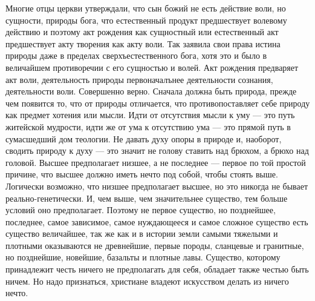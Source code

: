 \documentclass[12pt,oneside]{book}
\begin{document}
Многие отцы церкви утверждали, что сын божий не есть действие воли, но сущности, природы бога, что естественный продукт предшествует волевому действию и поэтому акт рождения как сущностный или естественный акт предшествует акту творения как акту воли. Так заявила свои права истина природы даже в пределах сверхъестественного бога, хотя это и было в величайшем противоречии с его сущностью и волей. Акт рождения предваряет акт воли, деятельность природы первоначалънее деятельности сознания, деятельности воли. Совершенно верно. Сначала должна быть природа, прежде чем появится то, что от природы отличается, что противопоставляет себе природу как предмет хотения или мысли. Идти от отсутствия мысли к уму --- это путь житейской мудрости, идти же от ума к отсутствию ума --- это прямой путь в сумасшедший дом теологии. Не давать духу опоры в природе и, наоборот, сводить природу к духу --- это значит не голову ставить над брюхом, а брюхо над головой. Высшее предполагает низшее, а не последнее --- первое по той простой причине, что высшее должно иметь нечто под собой, чтобы стоять выше. Логически возможно, что низшее предполагает высшее, но это никогда не бывает реально-генетически. И, чем выше, чем значительнее существо, тем больше условий оно предполагает. Поэтому не первое существо, но позднейшее, последнее, самое зависимое, самое нуждающееся и самое сложное существо есть существо величайшее, так же как и в истории земли самыми тяжелыми и плотными оказываются не древнейшие, первые породы, сланцевые и гранитные, но позднейшие, новейшие, базальты и плотные лавы. Существо, которому принадлежит честь ничего не предполагать для себя, обладает также честью быть ничем. Но надо признаться, христиане владеют искусством делать из ничего нечто.



\chapter{}
\end{document}
